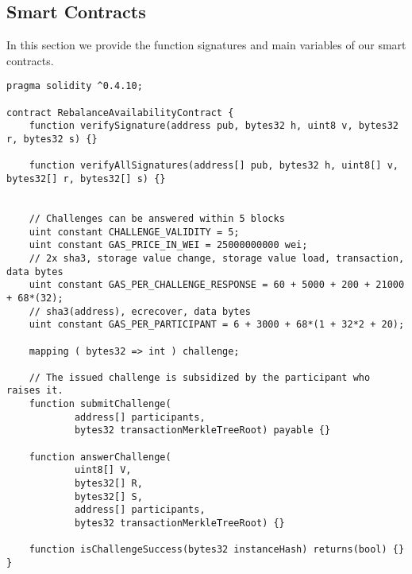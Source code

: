 \documentclass[sigconf]{acmart}
\begin{document}
\subsection{Smart Contracts}\label{sec:appendix:smartcontracts}
In this section we provide the function signatures and main variables of our smart contracts.

\begin{lstlisting}[linewidth=\columnwidth,breaklines=true, caption={Smart contract defined in challenge.sol.}]
pragma solidity ^0.4.10;

contract RebalanceAvailabilityContract {
    function verifySignature(address pub, bytes32 h, uint8 v, bytes32 r, bytes32 s) {}

    function verifyAllSignatures(address[] pub, bytes32 h, uint8[] v, bytes32[] r, bytes32[] s) {}


    // Challenges can be answered within 5 blocks
    uint constant CHALLENGE_VALIDITY = 5;
    uint constant GAS_PRICE_IN_WEI = 25000000000 wei;
    // 2x sha3, storage value change, storage value load, transaction, data bytes
    uint constant GAS_PER_CHALLENGE_RESPONSE = 60 + 5000 + 200 + 21000 + 68*(32);
    // sha3(address), ecrecover, data bytes
    uint constant GAS_PER_PARTICIPANT = 6 + 3000 + 68*(1 + 32*2 + 20);

    mapping ( bytes32 => int ) challenge;

    // The issued challenge is subsidized by the participant who raises it.
    function submitChallenge(
            address[] participants,
            bytes32 transactionMerkleTreeRoot) payable {}

    function answerChallenge(
            uint8[] V,
            bytes32[] R,
            bytes32[] S,
            address[] participants,
            bytes32 transactionMerkleTreeRoot) {}

    function isChallengeSuccess(bytes32 instanceHash) returns(bool) {}
}    
\end{lstlisting}
\end{document}
